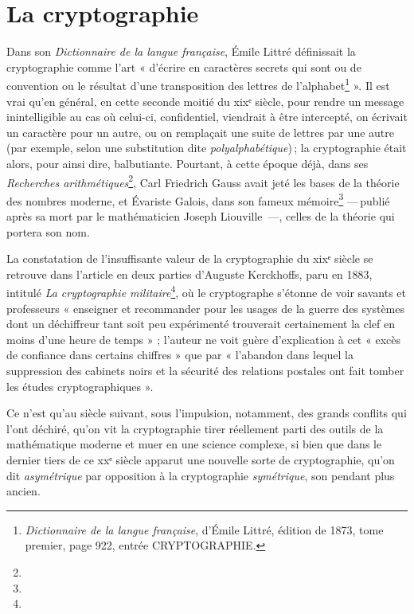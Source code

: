 
\section{La cryptographie} %
\label{sec:cryptographie}


Dans son {\it Dictionnaire de la langue française}, Émile Littré définissait la cryptographie
comme l’art « d'écrire en caractères secrets qui sont ou de convention ou le résultat d'une
transposition des lettres de l'alphabet\footnote{{\it Dictionnaire de la langue française}, d’Émile
Littré, édition de 1873, tome premier, page 922, entrée CRYPTOGRAPHIE.} ».
Il est vrai qu’en général, en cette seconde moitié  du {\sc xix}ᵉ siècle, pour rendre un message
inintelligible au cas où celui-ci, confidentiel, viendrait à être intercepté, on écrivait un
caractère pour un autre, ou on remplaçait une suite de lettres par une autre (par exemple, selon une
substitution dite {\it polyalphabétique\/}) ; la cryptographie était alors, pour ainsi dire,
balbutiante.
Pourtant, à cette époque déjà, dans ses {\it Recherches arithmétiques}\footnote{}, Carl Friedrich
Gauss avait jeté les bases de la théorie des nombres moderne, et Évariste Galois, dans son fameux
mémoire\footnote{} --- publié après sa mort par le mathématicien Joseph Liouville ---, celles de la
théorie qui portera son nom.

La constatation de l’insuffisante valeur de la cryptographie du {\sc xix}ᵉ siècle se retrouve dans
l’article en deux parties d’Auguste Kerckhoffs, paru en 1883, intitulé {\it La
cryptographie militaire}\footnote{}, où le cryptographe s’étonne de voir savants et professeurs «
enseigner et recommander pour les usages de la guerre des systèmes dont un déchiffreur tant soit peu
expérimenté trouverait certainement la clef en moins d’une heure de temps » ; l’auteur ne voit guère
d’explication à cet « excès de confiance dans certains chiffres » que par « l’abandon dans lequel la
suppression des cabinets noirs et la sécurité des relations postales ont fait tomber les études
cryptographiques ».

Ce n’est qu’au siècle suivant, sous l’impulsion, notamment, des grands conflits qui l’ont déchiré,
qu’on vit la cryptographie tirer réellement parti des outils de la mathématique moderne et muer en
une science complexe, si bien que dans le dernier tiers de ce {\sc xx}ᵉ siècle apparut une
nouvelle sorte de cryptographie, qu’on dit {\it asymétrique} par opposition à la cryptographie
{\it symétrique}, son pendant plus ancien.

